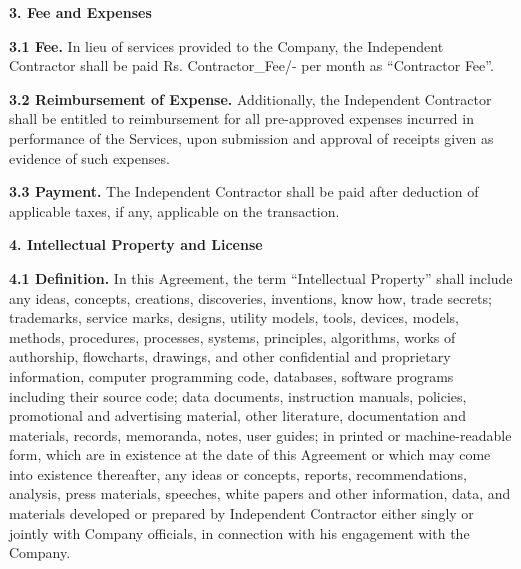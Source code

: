 \documentclass[12pt]{article}
\begin{document}
\vspace{1em}
\noindent
\textbf{3. Fee and Expenses}

\vspace{0.5em}
\noindent
\textbf{3.1 Fee.} In lieu of services provided to the Company, the Independent Contractor shall be paid Rs. {{Contractor_Fee}}/- per month as ``Contractor Fee''.

\vspace{0.5em}
\noindent
\textbf{3.2 Reimbursement of Expense.} Additionally, the Independent Contractor shall be entitled to reimbursement for all pre-approved expenses incurred in performance of the Services, upon submission and approval of receipts given as evidence of such expenses.

\vspace{0.5em}
\noindent
\textbf{3.3 Payment.} The Independent Contractor shall be paid after deduction of applicable taxes, if any, applicable on the transaction.

\vspace{1em}
\noindent
\textbf{4. Intellectual Property and License}

\vspace{0.5em}
\noindent
\textbf{4.1 Definition.} In this Agreement, the term ``Intellectual Property'' shall include any ideas, concepts, creations, discoveries, inventions, know how, trade secrets; trademarks, service marks, designs, utility models, tools, devices, models, methods, procedures, processes, systems, principles, algorithms, works of authorship, flowcharts, drawings, and other confidential and proprietary information, computer programming code, databases, software programs including their source code; data documents, instruction manuals, policies, promotional and advertising material, other literature, documentation and materials, records, memoranda, notes, user guides; in printed or machine-readable form, which are in existence at the date of this Agreement or which may come into existence thereafter, any ideas or concepts, reports, recommendations, analysis, press materials, speeches, white papers and other information, data, and materials developed or prepared by Independent Contractor either singly or jointly with Company officials, in connection with his engagement with the Company.
\end{document}
